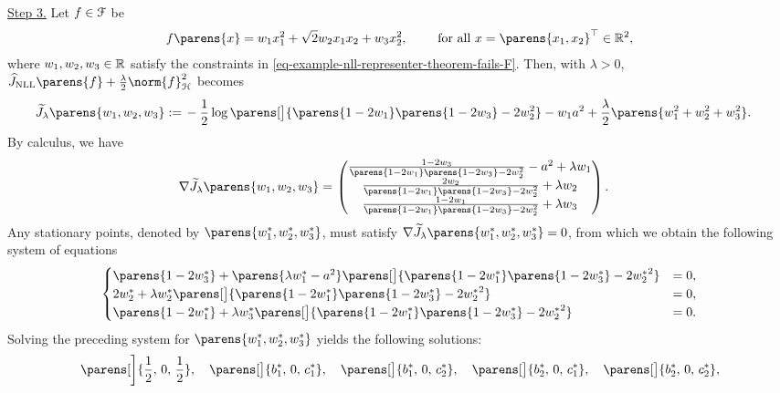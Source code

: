 	\underline{Step 3.} Let $f \in \mathcal{F}$ be 
	\begin{align*}
		f \parens{x} = w_1 x_1^2 + \sqrt{2} w_2 x_1 x_2 + w_3 x_2^2, \qquad \text{ for all } x = \parens{x_1, x_2}^\top \in \Real^2, 
	\end{align*}
	where $w_1, w_2, w_3 \in \mathbb{R}$ satisfy the constraints in \eqref{eq-example-nll-representer-theorem-fails-F}. Then, with $\lambda > 0$, $\widehat{J}_{\NLL} \parens{f} + \frac{\lambda}{2} \norm{f}_{\calH}^2$ becomes  
	\begin{align*}
		\widetilde{J}_{\lambda} \parens{w_1, w_2, w_3} := & \, - \frac{1}{2} \log \parens[\big]{\parens{1 - 2w_1} \parens{1 - 2w_3} - 2 w_2^2} - w_1 a^2 + \frac{\lambda}{2} \parens{w_1^2 + w_2^2 + w_3^2}. 
	\end{align*}
	By calculus, we have 
	\begin{align*}
		\nabla \widetilde{J}_{\lambda} \parens{w_1, w_2, w_3} = & \, \begin{pmatrix}
			\frac{1 - 2w_3}{\parens{1-2w_1} \parens{1-2w_3} - 2w_2^2} - a^2 + \lambda w_1 \\ 
			\frac{2w_2}{\parens{1-2w_1} \parens{1-2w_3} - 2w_2^2} + \lambda w_2 \\
			\frac{1 - 2w_1}{\parens{1-2w_1} \parens{1-2w_3} - 2w_2^2} + \lambda w_3
		\end{pmatrix}.  
	\end{align*}
	Any stationary points, denoted by $\parens{w_1^*, w_2^*, w_3^*}$, must satisfy $\nabla \widetilde{J}_{\lambda} \parens{w_1^*, w_2^*, w_3^*} = 0$, from which we obtain the following system of equations 
	\begin{align*}
		\begin{cases}
			\parens{1 - 2 w_3^*} + \parens{\lambda w_1^* - a^2} \parens[\big]{\parens{1 - 2w_1^*} \parens{1 - 2w_3^*} - 2{w_2^*}^2} & = 0, \\ 
			2 w_2^* + \lambda w_2^* \parens[\big]{\parens{1 - 2 w_1^*} \parens{1 - 2 w_3^*} - 2 {w_2^*}^2} & = 0, \\ 
			\parens{1 - 2 w_1^*} + \lambda w_3^* \parens[\big]{\parens{1 - 2w_1^*} \parens{1 - 2w_3^*} - 2{w_2^*}^2} & = 0. 
		\end{cases}	
	\end{align*}
	Solving the preceding system for $\parens{w_1^*, w_2^*, w_3^*}$ yields the following solutions: 
	\begin{align}\label{eq-example-all-sol}
		\parens[\bigg]{\frac{1}{2}, \, 0, \, \frac{1}{2}}, \quad \parens[\big]{b_1^*, \, 0, \, c_1^*}, \quad \parens[\big]{b_1^*, \, 0, \, c_2^*}, \quad \parens[\big]{b_2^*, \, 0, \, c_1^*}, \quad \parens[\big]{b_2^*, \, 0, \, c_2^*}, 
	\end{align}
